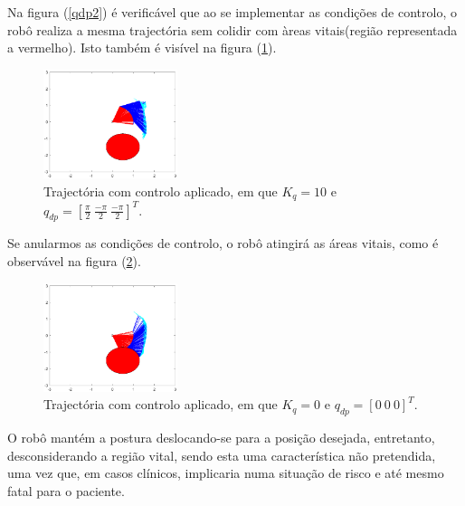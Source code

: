\documentclass[a4paper,twocolumn,final,11pt]{article}
\let\oldref\ref
\renewcommand{\ref}[1]{(\oldref{#1})}
\begin{document}
Na figura \ref{qdp2} é verificável que ao se implementar as condições de controlo, o robô realiza a mesma trajectória sem colidir com àreas vitais(região representada a vermelho). Isto também é visível na figura \ref{qdp3}.
\begin{figure}[H]
	\centering
	\includegraphics[width=0.35\textwidth]{qdp3.eps}
	\caption{Trajectória com controlo aplicado, em que $K_q=10$ e $q_{dp}=\left[\frac{\pi}{2} ~\frac{-\pi}{2}  ~\frac{-\pi}{2}\right]^T $.}
\label{qdp3}
\end{figure}
Se anularmos as condições de controlo, o robô atingirá as áreas vitais, como é observável na figura \ref{qdp1}.
\begin{figure}[H]
	\centering
	\includegraphics[width=0.35\textwidth]{qdp1.eps}
	\caption{Trajectória com controlo aplicado, em que $K_q=0$ e $q_{dp}=\left[0~0~0\right]^T $.}
\label{qdp1}
\end{figure}
O robô mantém a postura deslocando-se para a posição desejada,  entretanto, desconsiderando a região vital, sendo esta uma característica não pretendida, uma vez que, em casos clínicos, implicaria numa situação de risco e até mesmo fatal para o paciente.
\end{document}
